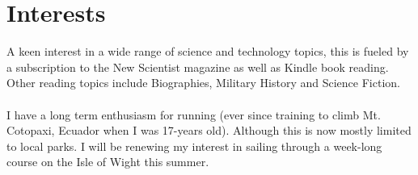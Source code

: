 
\section{Interests}

A keen interest in a wide range of science and technology topics, 
this is fueled by a subscription to the New Scientist magazine as 
well as Kindle book reading. Other reading topics include 
Biographies, Military History and Science Fiction. \\~\\
I have a long term enthusiasm for running (ever since training 
to climb Mt. Cotopaxi, Ecuador when I was 17-years old). 
Although this is now mostly limited to local parks. 
I will be renewing my interest in sailing through a week-long 
course on the Isle of Wight this summer.

\closesection{}
